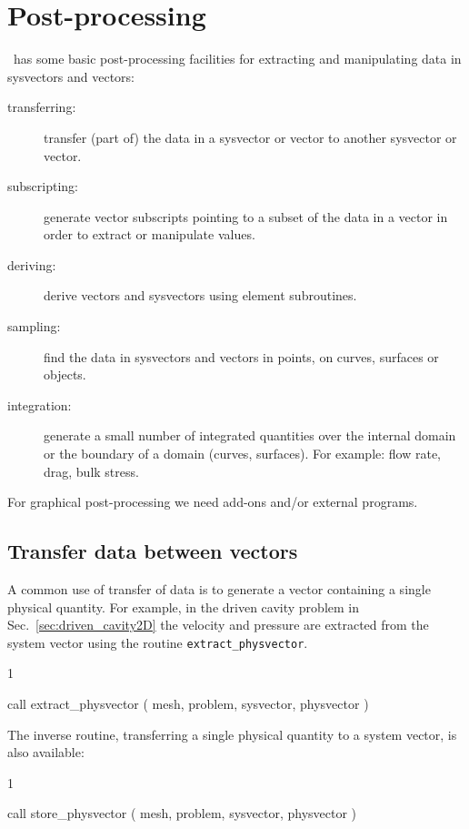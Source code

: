 
\chapter{Post-processing}

\label{ch:postprocessing}

\def\chaptertitle{Post-processing}
\def\headdate{27th April 2012}

\tfem\ has some basic post-processing facilities for extracting and
manipulating data in sysvectors and vectors:
\begin{description}
   \item[transferring:] transfer (part of) the data in a sysvector or vector to 
   another sysvector or vector.
   \item[subscripting:] generate vector subscripts pointing to a subset of the
    data in a vector in order to extract or manipulate values.
   \item[deriving:] derive vectors and sysvectors using element subroutines.
   \item[sampling:] find the data in sysvectors and vectors in points, on
    curves, surfaces or objects. 
   \item[integration:] generate a small number of integrated quantities over
    the internal domain or the boundary of a domain (curves, surfaces). For
    example: flow rate, drag, bulk stress.
\end{description}
 For
graphical post-processing we need add-ons and/or external programs.

\section{Transfer data between vectors}

A common use of transfer of data is to generate a vector containing a
single physical quantity. For example, in the driven cavity problem in
Sec.~\ref{sec:driven_cavity2D} the velocity and pressure are extracted from the
system vector using the routine \texttt{extract\_physvector}. 
\begin{listing}{1}

    call extract_physvector ( mesh, problem, sysvector, physvector )

\end{listing}
The inverse
routine, transferring a single physical quantity to a system vector, is also
available:
\begin{listing}{1}

    call store_physvector ( mesh, problem, sysvector, physvector )
 
\end{listing}

